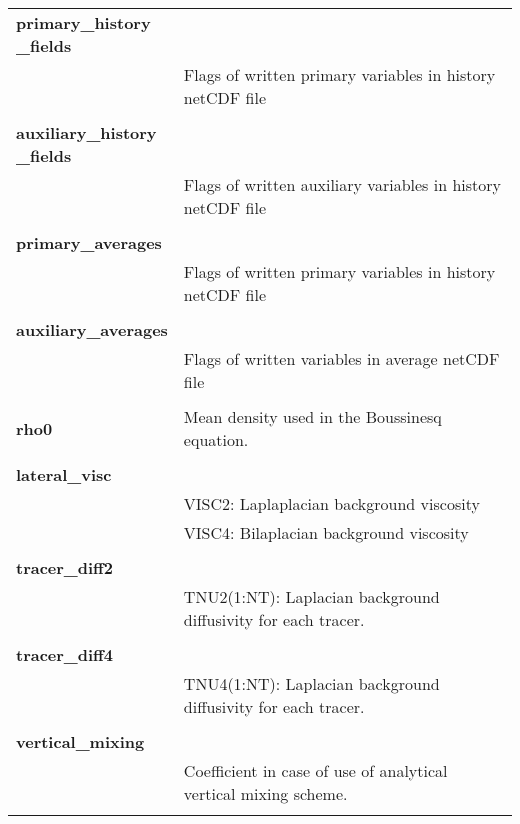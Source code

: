 \begin{longtable}{|p{0.25\linewidth}|p{0.75\linewidth}|}
\large{\textbf{primary\_history \_fields}} &     \\ 
&   Flags of written primary variables in history netCDF file \\ 
&  \\ 

\large{\textbf{auxiliary\_history \_fields}} &     \\ 
&  Flags of written auxiliary variables in history netCDF file \\ 
&  \\ 

\large{\textbf{primary\_averages}} &     \\ 
&  Flags of written primary variables in history netCDF file \\ 
&  \\ 

\large{\textbf{auxiliary\_averages}} &     \\ 
&  Flags of written variables in average netCDF file\\ 
&  \\ 

\large{\textbf{rho0}} & Mean density used in the Boussinesq equation. \\ 
&  \\  

\large{\textbf{lateral\_visc}} &     \\ 
&  VISC2: Laplaplacian background viscosity \\
&  VISC4: Bilaplacian  background viscosity \\
&  \\ 

\large{\textbf{tracer\_diff2}} &     \\ 
& TNU2(1:NT): Laplacian background diffusivity for  each tracer.  \\
&  \\ 

\large{\textbf{tracer\_diff4}} &     \\ 
& TNU4(1:NT): Laplacian background diffusivity for  each tracer.  \\
&  \\ 

\large{\textbf{vertical\_mixing}} &     \\ 
& Coefficient in case of use of analytical vertical mixing scheme.  \\ 
&  \\ 


\end{longtable}
